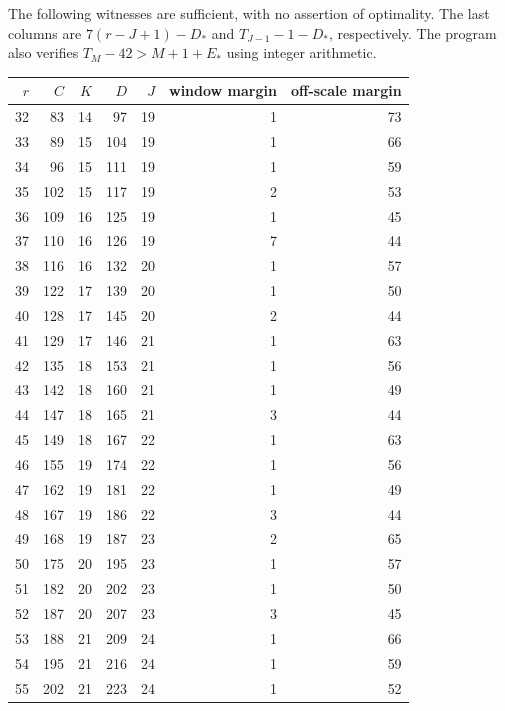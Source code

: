 \documentclass[11pt,a4paper]{article}
\begin{document}
The following witnesses are sufficient, with no assertion of optimality.
The last columns are $7(r-J+1)-D_*$ and $T_{J-1}-1-D_*$, respectively.
The program also verifies $T_M-42>M+1+E_*$ using integer arithmetic.

\begin{center}\small
\begin{tabular}{rrrrrrr}
\toprule
$r$ & $C$ & $K$ & $D$ & $J$ & window margin & off-scale margin\\\midrule
32 & 83 & 14 & 97 & 19 & 1 & 73\\
33 & 89 & 15 & 104 & 19 & 1 & 66\\
34 & 96 & 15 & 111 & 19 & 1 & 59\\
35 & 102 & 15 & 117 & 19 & 2 & 53\\
36 & 109 & 16 & 125 & 19 & 1 & 45\\
37 & 110 & 16 & 126 & 19 & 7 & 44\\
38 & 116 & 16 & 132 & 20 & 1 & 57\\
39 & 122 & 17 & 139 & 20 & 1 & 50\\
40 & 128 & 17 & 145 & 20 & 2 & 44\\
41 & 129 & 17 & 146 & 21 & 1 & 63\\
42 & 135 & 18 & 153 & 21 & 1 & 56\\
43 & 142 & 18 & 160 & 21 & 1 & 49\\
44 & 147 & 18 & 165 & 21 & 3 & 44\\
45 & 149 & 18 & 167 & 22 & 1 & 63\\
46 & 155 & 19 & 174 & 22 & 1 & 56\\
47 & 162 & 19 & 181 & 22 & 1 & 49\\
48 & 167 & 19 & 186 & 22 & 3 & 44\\
49 & 168 & 19 & 187 & 23 & 2 & 65\\
50 & 175 & 20 & 195 & 23 & 1 & 57\\
51 & 182 & 20 & 202 & 23 & 1 & 50\\
52 & 187 & 20 & 207 & 23 & 3 & 45\\
53 & 188 & 21 & 209 & 24 & 1 & 66\\
54 & 195 & 21 & 216 & 24 & 1 & 59\\
55 & 202 & 21 & 223 & 24 & 1 & 52\\
\bottomrule
\end{tabular}
\end{center}
\end{document}
